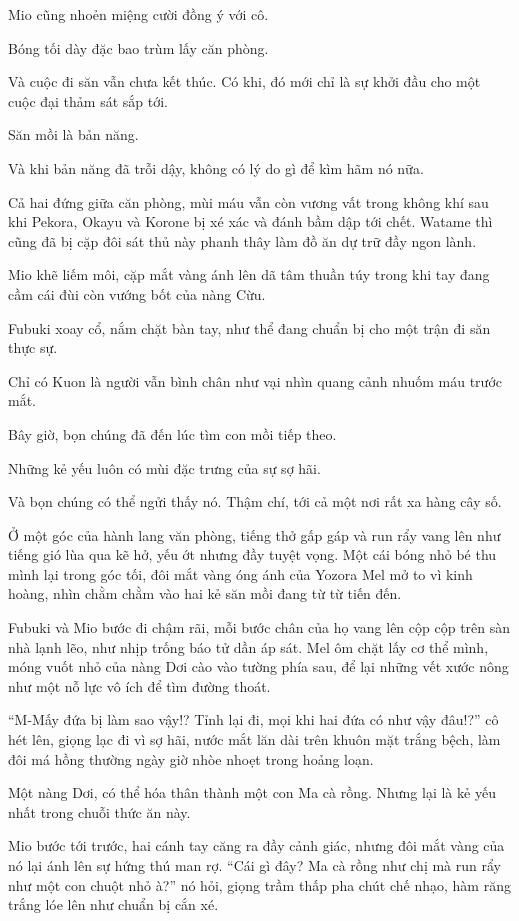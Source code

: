 \documentclass[../main.tex]{subfiles}
\begin{document}
Mio cũng nhoẻn miệng cười đồng ý với cô.

Bóng tối dày đặc bao trùm lấy căn phòng.

Và cuộc đi săn vẫn chưa kết thúc. Có khi, đó mới chỉ là sự khởi đầu cho một cuộc đại thảm sát sắp tới.

\ct

Săn mồi là bản năng.

Và khi bản năng đã trỗi dậy, không có lý do gì để kìm hãm nó nữa.

Cả hai đứng giữa căn phòng, mùi máu vẫn còn vương vất trong không khí sau khi Pekora, Okayu và Korone bị xé xác và đánh bầm dập tới chết. Watame thì cũng đã bị cặp đôi sát thủ này phanh thây làm đồ ăn dự trữ đầy ngon lành.

Mio khẽ liếm môi, cặp mắt vàng ánh lên dã tâm thuần túy trong khi tay đang cầm cái đùi còn vướng bốt của nàng Cừu.

Fubuki xoay cổ, nắm chặt bàn tay, như thể đang chuẩn bị cho một trận đi săn thực sự.

Chỉ có Kuon là người vẫn bình chân như vại nhìn quang cảnh nhuốm máu trước mắt.

Bây giờ, bọn chúng đã đến lúc tìm con mồi tiếp theo.

Những kẻ yếu luôn có mùi đặc trưng của sự sợ hãi.

Và bọn chúng có thể ngửi thấy nó. Thậm chí, tới cả một nơi rất xa hàng cây số.

\il

Ở một góc của hành lang văn phòng, tiếng thở gấp gáp và run rẩy vang lên như tiếng gió lùa qua kẽ hở, yếu ớt nhưng đầy tuyệt vọng. Một cái bóng nhỏ bé thu mình lại trong góc tối, đôi mắt vàng óng ánh của Yozora Mel mở to vì kinh hoàng, nhìn chằm chằm vào hai kẻ săn mồi đang từ từ tiến đến.

Fubuki và Mio bước đi chậm rãi, mỗi bước chân của họ vang lên cộp cộp trên sàn nhà lạnh lẽo, như nhịp trống báo tử dần áp sát. Mel ôm chặt lấy cơ thể mình, móng vuốt nhỏ của nàng Dơi cào vào tường phía sau, để lại những vết xước nông như một nỗ lực vô ích để tìm đường thoát.

``M-Mấy đứa bị làm sao vậy!? Tỉnh lại đi, mọi khi hai đứa có như vậy đâu!?'' cô hét lên, giọng lạc đi vì sợ hãi, nước mắt lăn dài trên khuôn mặt trắng bệch, làm đôi má hồng thường ngày giờ nhòe nhoẹt trong hoảng loạn.

Một nàng Dơi, có thể hóa thân thành một con Ma cà rồng. Nhưng lại là kẻ yếu nhất trong chuỗi thức ăn này.

Mio bước tới trước, hai cánh tay căng ra đầy cảnh giác, nhưng đôi mắt vàng của nó lại ánh lên sự hứng thú man rợ. ``Cái gì đây? Ma cà rồng như chị mà run rẩy như một con chuột nhỏ à?'' nó hỏi, giọng trầm thấp pha chút chế nhạo, hàm răng trắng lóe lên như chuẩn bị cắn xé.
\end{document}
